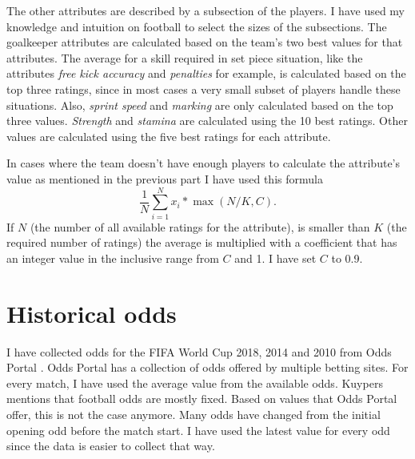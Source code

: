 The other attributes are described by a subsection of the players. I have used my knowledge and intuition on football to select the sizes of the subsections. The goalkeeper attributes are calculated based on the team's two best values for that attributes. The average for a skill required in set piece situation, like the attributes \textit{free kick accuracy} and \textit{penalties} for example, is calculated based on the top three ratings, since in most cases a very small subset of players handle these situations. Also, \textit{sprint speed} and \textit{marking} are only calculated based on the top three values. \textit{Strength} and \textit{stamina} are calculated using the 10 best ratings. Other values are calculated using the five best ratings for each attribute.

In cases where the team doesn't have enough players to calculate the attribute's value as mentioned in the previous part I have used this formula
\begin{equation}
\frac{1}{N}\sum_{i=1}^{N}x_i * \max{(N/K, C)}.
\end{equation}
If $N$ (the number of all available ratings for the attribute), is smaller than $K$ (the required number of ratings) the average is multiplied with a coefficient that has an integer value in the inclusive range from $C$ and 1. I have set $C$ to 0.9.

\section{Historical odds}
I have collected odds for the FIFA World Cup 2018, 2014 and 2010 from Odds Portal \cite{oddsportal}. Odds Portal has a collection of odds offered by multiple betting sites. For every match, I have used the average value from the available odds. Kuypers \cite{kuypers2008} mentions that football odds are mostly fixed. Based on values that Odds Portal offer, this is not the case anymore. Many odds have changed from the initial opening odd before the match start. I have used the latest value for every odd since the data is easier to collect that way.